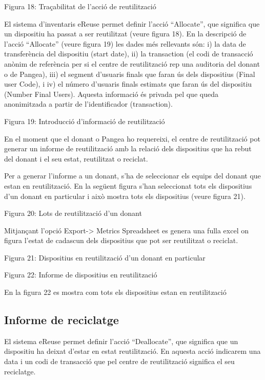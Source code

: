\documentclass[
]{book}
\begin{document}
Figura 18: Traçabilitat de l'acció de reutilització

El sistema d'inventaris eReuse permet definir l'acció ``Allocate'', que significa que un dispositiu ha passat a ser reutilitzat (veure figura 18). En la descripció de l'acció ``Allocate'' (veure figura 19) les dades més rellevants són: i) la data de transferència del dispositiu (start date), ii) la transaction (el codi de transacció anònim de referència per si el centre de reutilització rep una auditoria del donant o de Pangea), iii) el segment d'usuaris finals que faran ús dels dispositius (Final user Code), i iv) el número d'usuaris finals estimats que faran ús del dispositiu (Number Final Users). Aquesta informació és privada pel que queda anonimitzada a partir de l'identificador (transaction).

Figura 19: Introducció d'informació de reutilització

En el moment que el donant o Pangea ho requereixi, el centre de reutilització pot generar un informe de reutilització amb la relació dels dispositius que ha rebut del donant i el seu estat, reutilitzat o reciclat.

Per a generar l'informe a un donant, s'ha de seleccionar els equips del donant que estan en reutilització. En la següent figura s'han seleccionat tots els dispositius d'un donant en particular i això mostra tots els dispositius (veure figura 21).

Figura 20: Lots de reutilització d'un donant

Mitjançant l'opció Export-\textgreater{} Metrics Spreadsheet es genera una fulla excel on figura l'estat de cadascun dels dispositius que pot ser reutilitzat o reciclat.

Figura 21: Dispositius en reutilització d'un donant en particular

Figura 22: Informe de dispositius en reutilització

En la figura 22 es mostra com tots els dispositius estan en reutilització

\hypertarget{informe-de-reciclatge}{%
\subsection{Informe de reciclatge}\label{informe-de-reciclatge}}

El sistema eReuse permet definir l'acció ``Deallocate'', que significa que un dispositiu ha deixat d'estar en estat reutilització. En aquesta acció indicarem una data i un codi de transacció que pel centre de reutilització significa el seu reciclatge.
\end{document}
